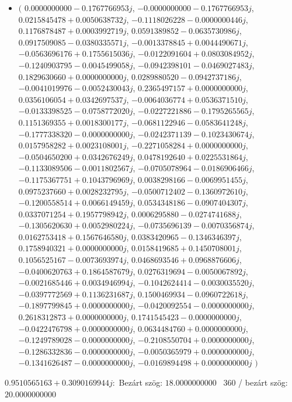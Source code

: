 \documentclass[14pt,a4paper]{article}
\begin{document}
\begin{itemize}
\item
$\big($
$0.0000000000-0.1767766953j$, $-0.0000000000-0.1767766953j$, $0.0215845478+0.0050638732j$, $-0.1118026228-0.0000000446j$, $0.1176878487+0.0003992719j$, $0.0591389852-0.0635730986j$, $0.0917509085-0.0380335571j$, $-0.0013378845+0.0044490671j$, $-0.0563696176+0.1755615036j$, $-0.0122091604+0.0803084952j$, $-0.1240903795-0.0045499058j$, $-0.0942398101-0.0469027483j$, $0.1829630660+0.0000000000j$, $0.0289880520-0.0942737186j$, $-0.0041019976-0.0052430043j$, $0.2365497157+0.0000000000j$, $0.0356106054+0.0342697537j$, $-0.0064036774+0.0536371510j$, $-0.0133398525-0.0758772020j$, $-0.0227221886-0.1795265565j$, $0.1151369355+0.0018300177j$, $-0.0681122946-0.0583641248j$, $-0.1777338320-0.0000000000j$, $-0.0242371139-0.1023430674j$, $0.0157958282+0.0023108001j$, $-0.2271058284+0.0000000000j$, $-0.0504650200+0.0342676249j$, $0.0478192640+0.0225531864j$, $-0.1133089506-0.0011802567j$, $-0.0705078964-0.0186906466j$, $-0.1175367751+0.1043796969j$, $0.0038298166-0.0069951455j$, $0.0975237660+0.0028232795j$, $-0.0500712402-0.1360972610j$, $-0.1200558514+0.0066149459j$, $0.0534348186-0.0907404307j$, $0.0337071254+0.1957798942j$, $0.0006295880-0.0274741688j$, $-0.1305620630+0.0052980224j$, $-0.0735696139-0.0070356874j$, $0.0162753418+0.1567646580j$, $0.0383420965-0.1346346397j$, $0.1758940321+0.0000000000j$, $0.0158419685+0.1450708001j$, $0.1056525167-0.0073693974j$, $0.0468693546+0.0968876606j$, $-0.0400620763+0.1864587679j$, $0.0276319694-0.0050067892j$, $-0.0021685446+0.0034946994j$, $-0.1042624414-0.0030035520j$, $-0.0397772569+0.1136231687j$, $0.1500469934-0.0960722618j$, $-0.1897799845+0.0000000000j$, $-0.0420092554-0.0000000000j$, $0.2618312873+0.0000000000j$, $0.1741545423-0.0000000000j$, $-0.0422476798+0.0000000000j$, $0.0634484760+0.0000000000j$, $-0.1249789028-0.0000000000j$, $-0.2108550704+0.0000000000j$, $-0.1286332836-0.0000000000j$, $-0.0050365979+0.0000000000j$, $-0.1341626487-0.0000000000j$, $-0.0169894498+0.0000000000j$
$\big)$
\end{itemize}
$0.9510565163+0.3090169944j$:\
Bezárt szög: $18.0000000000$ \
360 / bezárt szög: $20.0000000000$\
\end{document}
